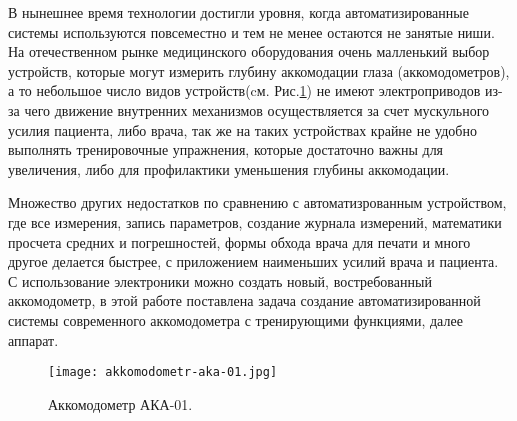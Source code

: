 В нынешнее время технологии достигли уровня, когда автоматизированные системы используются повсеместно и тем не менее остаются не занятые ниши. На отечественном рынке медицинского оборудования очень малленький выбор устройств, которые могут измерить глубину аккомодации глаза (аккомодометров), а то небольшое число видов устройств(cм. Рис.\ref{fig:aka-01}) не имеют электроприводов из-за чего движение внутренних механизмов осуществляется за счет мускульного усилия пациента, либо врача, так же на таких устройствах крайне не удобно выполнять тренировочные упражнения, которые достаточно важны для увеличения, либо для профилактики уменьшения глубины аккомодации.

Множество других недостатков по сравнению с автоматизрованным устройством, где все измерения, запись параметров, создание журнала измерений, математики просчета средних и погрешностей, формы обхода врача для печати и много другое делается быстрее, с приложением наименьших усилий врача и пациента. С использование электроники можно создать новый, востребованный аккомодометр, в этой работе поставлена задача создание автоматизированной системы современного аккомодометра с тренирующими функциями, далее аппарат.
\begin{figure}[ht]
\centering
    \centering
    \texttt{[image: akkomodometr-aka-01.jpg]}
    \caption{Аккомодометр АКА-01.}
    \label{fig:aka-01}
\end{figure}	